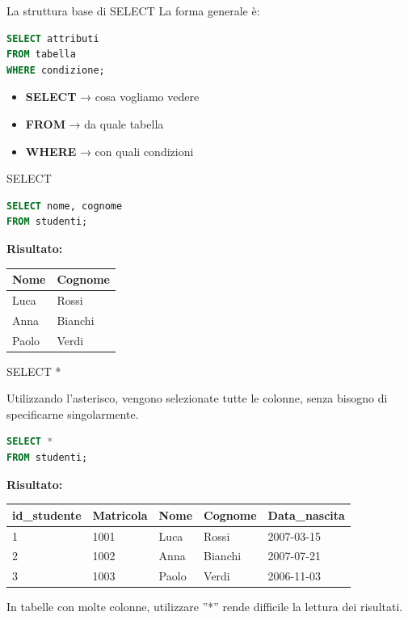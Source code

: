 \documentclass{beamer}
\begin{document}
\begin{frame}[fragile]{La struttura base di SELECT}
La forma generale è:

\begin{lstlisting}[language=SQL]
SELECT attributi
FROM tabella
WHERE condizione;
\end{lstlisting}

\begin{itemize}
    \item \textbf{SELECT} → cosa vogliamo vedere
    \item \textbf{FROM} → da quale tabella
    \item \textbf{WHERE} → con quali condizioni
\end{itemize}
\end{frame}

\begin{frame}[fragile]{SELECT}

\begin{lstlisting}[language=SQL]
SELECT nome, cognome
FROM studenti;
\end{lstlisting}

\medskip
\textbf{Risultato:}
\begin{center}
\begin{tabular}{|l|l|}
\hline
Nome & Cognome \\
\hline
Luca & Rossi \\
Anna & Bianchi \\
Paolo & Verdi \\
\hline
\end{tabular}
\end{center}

\end{frame}

\begin{frame}[fragile]{SELECT *}

Utilizzando l'asterisco, vengono selezionate tutte le colonne, senza bisogno di specificarne singolarmente.

\begin{lstlisting}[language=SQL]
SELECT *
FROM studenti;
\end{lstlisting}

\medskip
\textbf{Risultato:}
\begin{center}
\begin{tabular}{|l|l|l|l|l|}
\hline
id\_studente & Matricola & Nome & Cognome & Data\_nascita \\
\hline
1 & 1001 & Luca & Rossi & 2007-03-15 \\
2 & 1002 & Anna & Bianchi & 2007-07-21 \\
3 & 1003 & Paolo & Verdi & 2006-11-03 \\
\hline
\end{tabular}
\end{center}

\medskip
In tabelle con molte colonne, utilizzare ''*'' rende difficile la lettura dei risultati.
\end{frame}
\end{document}
